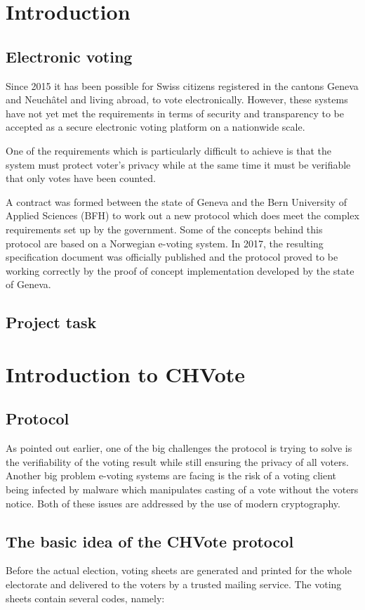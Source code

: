 \chapter{Introduction}
\section{Electronic voting}
Since 2015 it has been possible for Swiss citizens registered in the cantons Geneva and Neuchâtel and living abroad, to vote electronically. However, these systems have not yet met the requirements in terms of security and transparency to be accepted as a secure electronic voting platform on a nationwide scale.

One of the requirements which is particularly difficult to achieve is that the system must protect voter's privacy while at the same time it must be verifiable that only votes have been counted.

A contract was formed between the state of Geneva and the Bern University of Applied Sciences (BFH) to work out a new protocol which does meet the complex requirements set up by the government. Some of the concepts behind this protocol are based on a Norwegian e-voting system. In 2017, the resulting specification document was officially published and the protocol proved to be working correctly by the proof of concept implementation developed by the state of Geneva.

\section{Project task}

\chapter{Introduction to CHVote}
\section{Protocol}
As pointed out earlier, one of the big challenges the protocol is trying to solve is the verifiability of the voting result while still ensuring the privacy of all voters. Another big problem e-voting systems are facing is the risk of a voting client being infected by malware which manipulates casting of a vote without the voters notice. Both of these issues are addressed by the use of modern cryptography.

\section{The basic idea of the CHVote protocol}
Before the actual election, voting sheets are generated and printed for the whole electorate and delivered to the voters by a trusted mailing service. The voting sheets contain several codes, namely:

